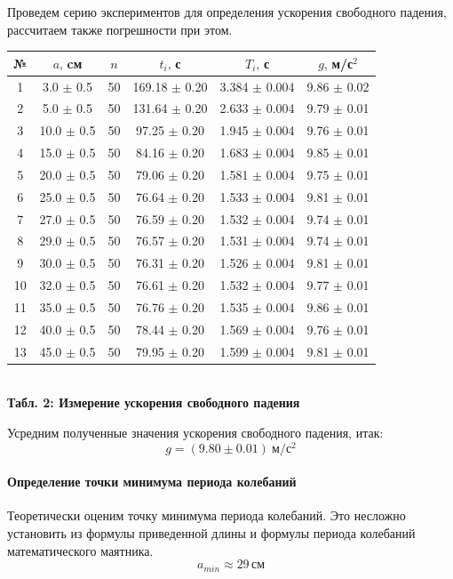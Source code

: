 \documentclass[12pt,a4paper]{scrartcl}
\begin{document}
	\par Проведем серию экспериментов для определения ускорения свободного падения, рассчитаем также погрешности при этом.
	
	\begin{center}
		\begin{tabular}{|c|c|c|c|c|c|}
			\hline № & $a,\,$cм & $n$ & $t_i,\,$с & $T_i,\,$с & $g,\,$м/с$^2$
			\\\hline 1 & 3.0 $\pm$ 0.5 & 50 & 169.18 $\pm$ 0.20 & 3.384 $\pm$ 0.004 & 9.86 $\pm$ 0.02
			\\\hline 2 & 5.0 $\pm$ 0.5 & 50 & 131.64 $\pm$ 0.20 & 2.633 $\pm$ 0.004 & 9.79 $\pm$ 0.01
			\\\hline 3 & 10.0 $\pm$ 0.5 & 50 & 97.25 $\pm$ 0.20 & 1.945 $\pm$ 0.004 & 9.76 $\pm$ 0.01
			\\\hline 4 & 15.0 $\pm$ 0.5 & 50 & 84.16 $\pm$ 0.20 & 1.683 $\pm$ 0.004 & 9.85 $\pm$ 0.01
			\\\hline 5 & 20.0 $\pm$ 0.5 & 50 & 79.06 $\pm$ 0.20 & 1.581 $\pm$ 0.004 & 9.75 $\pm$ 0.01
			\\\hline 6 & 25.0 $\pm$ 0.5 & 50 & 76.64 $\pm$ 0.20 & 1.533 $\pm$ 0.004 & 9.81 $\pm$ 0.01
			\\\hline 7 & 27.0 $\pm$ 0.5 & 50 & 76.59 $\pm$ 0.20 & 1.532 $\pm$ 0.004 & 9.74 $\pm$ 0.01
			\\\hline 8 & 29.0 $\pm$ 0.5 & 50 & 76.57 $\pm$ 0.20 & 1.531 $\pm$ 0.004 & 9.74 $\pm$ 0.01
			\\\hline 9 & 30.0 $\pm$ 0.5 & 50 & 76.31 $\pm$ 0.20 & 1.526 $\pm$ 0.004 & 9.81 $\pm$ 0.01
			\\\hline 10 & 32.0 $\pm$ 0.5 & 50 & 76.61 $\pm$ 0.20 & 1.532 $\pm$ 0.004 & 9.77 $\pm$ 0.01
			\\\hline 11 & 35.0 $\pm$ 0.5 & 50 & 76.76 $\pm$ 0.20 & 1.535 $\pm$ 0.004 & 9.86 $\pm$ 0.01
			\\\hline 12 & 40.0 $\pm$ 0.5 & 50 & 78.44 $\pm$ 0.20 & 1.569 $\pm$ 0.004 & 9.76 $\pm$ 0.01
			\\\hline 13 & 45.0 $\pm$ 0.5 & 50 & 79.95 $\pm$ 0.20 & 1.599 $\pm$ 0.004 & 9.81 $\pm$ 0.01
			\\\hline
		\end{tabular}
		\\\textbf{Табл. 2: Измерение ускорения свободного падения}
	\end{center}

	Усредним полученные значения ускорения свободного падения, итак:
	$$g = (9.80 \pm 0.01)\ \text{м}/\text{с}^2$$
	
	\paragraph{Определение точки минимума периода колебаний} \hfill
	\par Теоретически оценим точку минимума периода колебаний. Это несложно установить из формулы приведенной длины и формулы периода колебаний математического маятника.
	$$a_{min} \approx 29\,\text{см}$$
	
\end{document}

